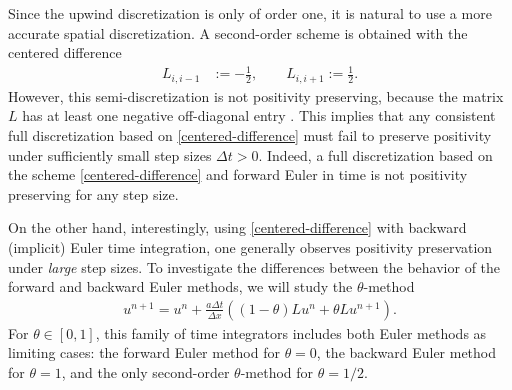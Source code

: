 \documentclass[a4paper]{article}
\newcommand{\dt}{\Delta t}
\newcommand{\dx}{\Delta x}
\newcommand{\te}{\theta}
\begin{document}
Since the upwind discretization is only of order one, it is natural to use a more accurate spatial discretization. A second-order scheme is
obtained with the centered difference
\begin{align} \label{centered-difference}
    L_{i,i-1} & := -\frac{1}{2},\quad\quad L_{i,i+1} :=  \frac{1}{2}.
\end{align}
 However, this semi-discretization is not positivity preserving, because the matrix $L$ has at least one negative off-diagonal entry \cite[Chapter I, Theorem 7.2]{hundsdorferverwer}.
This implies that any consistent full discretization based on \eqref{centered-difference}
must fail to preserve positivity under sufficiently small step sizes $\dt>0$.
Indeed, a full discretization based on the scheme \eqref{centered-difference}
and forward Euler in time is not positivity preserving for any step size.

On the other hand, interestingly, using \eqref{centered-difference} with backward (implicit) 
Euler time integration, one generally observes positivity preservation
under \emph{large} step sizes.  To investigate the differences between the behavior
of the forward and backward Euler methods, we will study the $\theta$-method \cite[Chapter IV.3]{hairerwanner}
\begin{align}\label{firsttheta}
    u^{n+1} = u^n + \frac{a\dt}{\dx}((1-\theta)Lu^n + \theta Lu^{n+1}).
\end{align}
For $\te\in[0,1]$, this family of time integrators includes both Euler methods as limiting cases: the forward Euler method for $\te=0$, the backward 
 Euler method for $\te=1$, and the only second-order $\te$-method for $\te=1/2$. 








\end{document}
